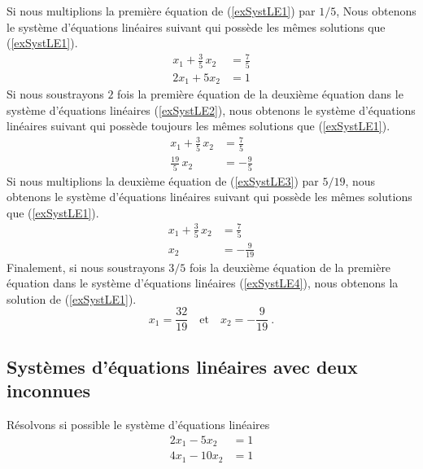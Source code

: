 {\begin{egg}
Si nous multiplions la première équation de (\ref{exSystLE1}) par $1/5$,
Nous obtenons le système d'équations linéaires suivant qui possède les
mêmes solutions que (\ref{exSystLE1}).
\begin{equation} \label{exSystLE2}
\begin{split}
x_1 + \frac{3}{5}\,x_2 &= \frac{7}{5} \\
2x_1 + 5x_2 &= 1
\end{split}
\end{equation}
Si nous soustrayons $2$ fois la première équation de la deuxième équation
dans le système d'équations linéaires (\ref{exSystLE2}), nous
obtenons le système d'équations linéaires suivant qui possède toujours
les mêmes solutions que
(\ref{exSystLE1}).
\begin{equation} \label{exSystLE3}
\begin{split}
x_1 + \frac{3}{5}\,x_2 &= \frac{7}{5} \\
\frac{19}{5}\,x_2 &= -\frac{9}{5}
\end{split}
\end{equation}
Si nous multiplions la deuxième équation de (\ref{exSystLE3}) par $5/19$,
nous obtenons le système d'équations linéaires suivant qui possède les
mêmes solutions que (\ref{exSystLE1}).
\begin{equation} \label{exSystLE4}
\begin{split}
x_1 + \frac{3}{5}\,x_2 &= \frac{7}{5} \\
x_2 &= -\frac{9}{19}
\end{split}
\end{equation}
Finalement, si nous soustrayons $3/5$ fois la deuxième équation de la
première équation dans le système d'équations linéaires
(\ref{exSystLE4}), nous obtenons la solution de (\ref{exSystLE1}).
\[
x_1 = \frac{32}{19} \quad \text{et} \quad
x_2 = -\frac{9}{19} \ .
\]
\label{IntroReductLin}
\end{egg}

\subsection{Systèmes d'équations linéaires avec deux inconnues}

\begin{egg}
Résolvons si possible le système d'équations linéaires
\begin{equation}\label{ex2SystLE1}
\begin{split}
2x_1- 5x_2 &= 1 \\
4x_1 - 10x_2 &= 1
\end{split}
\end{equation}


\end{egg}}
